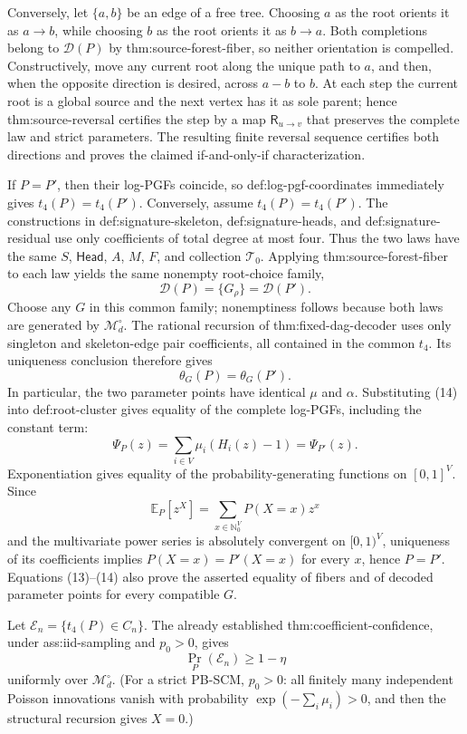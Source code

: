 Conversely, let \(\{a,b\}\) be an edge of a free tree.  Choosing \(a\) as the root orients it as \(a\to b\), while choosing \(b\) as the root orients it as \(b\to a\).  Both completions belong to \(\mathcal D(P)\) by thm:source-forest-fiber, so neither orientation is compelled.  Constructively, move any current root along the unique path to \(a\), and then, when the opposite direction is desired, across \(a-b\) to \(b\).  At each step the current root is a global source and the next vertex has it as sole parent; hence thm:source-reversal certifies the step by a map \(\mathsf R_{u\to v}\) that preserves the complete law and strict parameters.  The resulting finite reversal sequence certifies both directions and proves the claimed if-and-only-if characterization.

If \(P=P'\), then their log-PGFs coincide, so def:log-pgf-coordinates immediately gives \(t_4(P)=t_4(P')\).  Conversely, assume \(t_4(P)=t_4(P')\).  The constructions in def:signature-skeleton, def:signature-heads, and def:signature-residual use only coefficients of total degree at most four.  Thus the two laws have the same \(S\), \(\mathsf{Head}\), \(A\), \(M\), \(F\), and collection \(\mathcal T_0\).  Applying thm:source-forest-fiber to each law yields the same nonempty root-choice family,
\[
 \mathcal D(P)=\{G_\rho\}=\mathcal D(P').
\tag{13}
\]
Choose any \(G\) in this common family; nonemptiness follows because both laws are generated by \(\mathcal M_d^\circ\).  The rational recursion of thm:fixed-dag-decoder uses only singleton and skeleton-edge pair coefficients, all contained in the common \(t_4\).  Its uniqueness conclusion therefore gives
\[
 \theta_G(P)=\theta_G(P').
\tag{14}
\]
In particular, the two parameter points have identical \(\mu\) and \(\alpha\).  Substituting (14) into def:root-cluster gives equality of the complete log-PGFs, including the constant term:
\[
 \Psi_P(z)=\sum_{i\in V}\mu_i(H_i(z)-1)=\Psi_{P'}(z).
\]
Exponentiation gives equality of the probability-generating functions on \([0,1]^V\).  Since
\[
 \mathbb E_P[z^X]=\sum_{x\in\mathbb N_0^V}P(X=x)z^x
\]
and the multivariate power series is absolutely convergent on \([0,1)^V\), uniqueness of its coefficients implies \(P(X=x)=P'(X=x)\) for every \(x\), hence \(P=P'\).  Equations (13)--(14) also prove the asserted equality of fibers and of decoded parameter points for every compatible \(G\).

Let \(\mathcal E_n=\{t_4(P)\in C_n\}\).  The already established thm:coefficient-confidence, under ass:iid-sampling and \(p_0>0\), gives
\[
 \Pr_P(\mathcal E_n)\ge1-\eta
\tag{15}
\]
uniformly over \(\mathcal M_d^\circ\).  (For a strict PB-SCM, \(p_0>0\): all finitely many independent Poisson innovations vanish with probability \(\exp(-\sum_i\mu_i)>0\), and then the structural recursion gives \(X=0\).)

